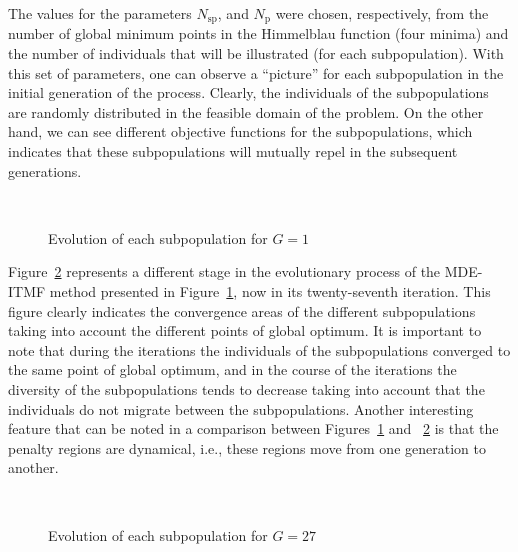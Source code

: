 \documentclass[smallextended]{svjour3}       %
\begin{document}
The values for the parameters $N_{\text{sp}}$, and $N_{\text{p}}$ were chosen, respectively, from the number of global minimum points in the Himmelblau function (four minima) and the number of individuals that will be illustrated (for each subpopulation). With this set of parameters, one can observe a ``picture'' for each subpopulation in the initial generation of the process. Clearly, the individuals of the subpopulations are randomly distributed in the feasible domain of the problem. On the other hand, we can see different objective functions for the subpopulations, which indicates that these subpopulations will mutually repel in the subsequent generations.

\begin{figure}[!htb]
\centering
{} \;
 \\  
 \;
\caption{Evolution of each subpopulation for $ G = 1 $}
\label{fig:exemplo1}
\end{figure}

Figure~\ref{fig:exemplo2} represents a different stage in the evolutionary process of the MDE-ITMF method presented in Figure~\ref{fig:exemplo1}, now in its twenty-seventh iteration. This figure clearly indicates the convergence areas of the different subpopulations taking into account the different points of global optimum. It is important to note that during the iterations the individuals of the subpopulations converged to the same point of global optimum, and in the course of the iterations the diversity of the subpopulations tends to decrease taking into account that the individuals do not migrate between the subpopulations. Another interesting feature that can be noted in a comparison between Figures~\ref{fig:exemplo1} and ~\ref{fig:exemplo2} is that the penalty regions are dynamical, i.e., these regions move from one generation to another. 

\begin{figure}[!htb]
\centering
{} \;
 \\  
 \;
\caption{Evolution of each subpopulation for $ G = 27 $}
\label{fig:exemplo2}
\end{figure}
\end{document}
